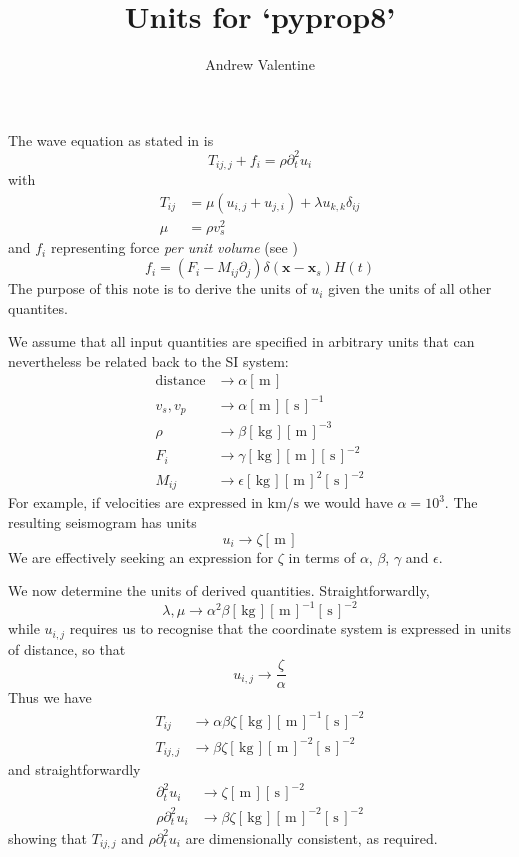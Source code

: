 \documentclass[a4paper,11pt]{article}
\title{Units for `pyprop8'}
\author{Andrew Valentine}
\newcommand{\metres}{\ensuremath{\left[\,\mathrm{m\,}\right]}}
\newcommand{\seconds}{\ensuremath{\left[\,\mathrm{s}\,\right]}}
\newcommand{\kg}{\ensuremath{\left[\,\mathrm{kg}\,\right]}}
\begin{document}
\maketitle
The wave equation as stated in \cite{OToole2011} is
\begin{equation}
T_{ij,j} +f_i = \rho \partial_t^2 u_i
\end{equation}
with
\begin{align}
T_{ij} &= \mu(u_{i,j} + u_{j,i}) + \lambda u_{k,k} \delta_{ij}\\
\mu &=\rho v_s^2
\end{align}
and $f_i$ representing force \emph{per unit volume} (see \cite{Woodhouse2007})
\begin{equation}
f_i = (F_i - M_{ij}\partial_j)\delta(\mathbf{x}-\mathbf{x}_s)H(t)
\end{equation}
The purpose of this note is to derive the units of $u_i$ given the units of all other quantites.

We assume that all input quantities are specified in arbitrary units that can nevertheless be related back to the SI system:
\begin{align}
\mathrm{distance} &\to \alpha \metres\\
v_s, v_p &\to \alpha \metres \seconds^{-1}\\
\rho & \to \beta \kg \metres^{-3}\\
F_i & \to \gamma \kg \metres \seconds^{-2}\\
M_{ij} & \to \epsilon \kg \metres^2 \seconds^{-2}
\end{align}
For example, if velocities are expressed in $\mathrm{km}/\mathrm{s}$ we would have $\alpha = 10^3$. The resulting seismogram has units 
\begin{equation}
u_i \to \zeta \metres
\end{equation}
We are effectively seeking an expression for $\zeta$ in terms of $\alpha$, $\beta$, $\gamma$ and $\epsilon$.

We now determine the units of derived quantities. Straightforwardly, \[\lambda,\mu \to \alpha^2\beta\kg\metres^{-1}\seconds^{-2}\]
while $u_{i,j}$ requires us to recognise that the coordinate system is expressed in units of distance, so that \[u_{i,j}\to\frac{\zeta}{\alpha}\] Thus we have
\begin{align}
T_{ij} &\to \alpha\beta\zeta\kg\metres^{-1}\seconds^{-2}\\
T_{ij,j} &\to \beta\zeta\kg\metres^{-2}\seconds^{-2}
\end{align}
and straightforwardly
\begin{align}
\partial_t^2 u_i &\to \zeta \metres\seconds^{-2}\\
\rho \partial_t^2 u_i &\to \beta\zeta \kg\metres^{-2}\seconds^{-2}
\end{align}
showing that $T_{ij,j}$ and $\rho \partial_t^2 u_i$ are dimensionally consistent, as required.
\end{document}
